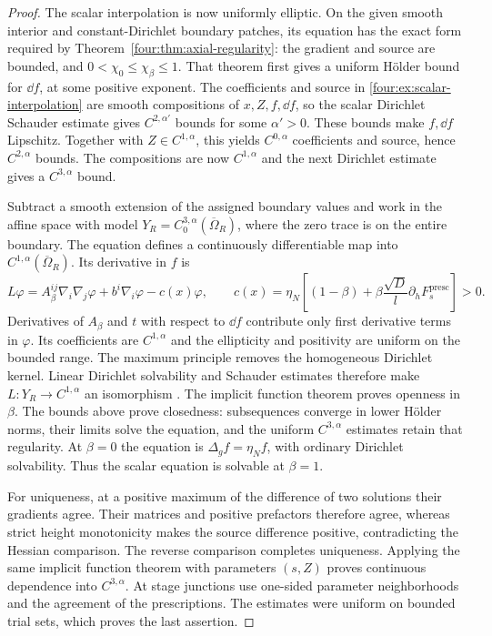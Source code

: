 \begin{proof}
The scalar interpolation is now uniformly elliptic.  On the given
smooth interior and constant-Dirichlet boundary patches, its equation
has the exact form required by Theorem~\ref{four:thm:axial-regularity}:
the gradient and source are bounded, and
$0<\chi_0\le\chi_\beta\le1$.  That theorem first gives a uniform
H\"older bound for $\dd f$, at some positive exponent.  The coefficients
and source in \eqref{four:ex:scalar-interpolation} are smooth compositions
of $x,Z,f,\dd f$, so the scalar Dirichlet Schauder estimate gives
$C^{2,\alpha'}$ bounds for some $\alpha'>0$.  These bounds make
$f,\dd f$ Lipschitz.  Together with $Z\in C^{1,\alpha}$, this yields
$C^{0,\alpha}$ coefficients and source, hence $C^{2,\alpha}$ bounds.
The compositions are now $C^{1,\alpha}$ and the next Dirichlet estimate
gives a $C^{3,\alpha}$ bound.

Subtract a smooth extension of the assigned boundary values and work
in the affine space with model
$Y_R=C^{3,\alpha}_0(\overline\Omega_R)$, where the zero trace is on the
entire boundary.  The equation defines a continuously differentiable
map into $C^{1,\alpha}(\overline\Omega_R)$.  Its derivative in $f$ is
\[
 L\varphi=A_\beta^{ij}\nabla_i\nabla_j\varphi
          +b^i\nabla_i\varphi-c(x)\varphi,
 \qquad
 c(x)=\eta_N\left[(1-\beta)+
 \beta\frac{\sqrt D}{l}\partial_hF_s^{\mathrm{presc}}\right]>0.
\]
Derivatives of $A_\beta$ and $t$ with respect to $\dd f$ contribute
only first derivative terms in $\varphi$.  Its coefficients are
$C^{1,\alpha}$ and the ellipticity and positivity are uniform on the
bounded range.  The maximum principle removes the homogeneous
Dirichlet kernel.  Linear Dirichlet solvability and Schauder estimates
therefore make $L:Y_R\to C^{1,\alpha}$ an isomorphism
\cite{GilbargTrudinger2001}.  The implicit function theorem proves openness in
$\beta$.  The bounds above prove closedness: subsequences converge in
lower H\"older norms, their limits solve the equation, and the uniform
$C^{3,\alpha}$ estimates retain that regularity.  At $\beta=0$ the
equation is $\Delta_gf=\eta_Nf$, with ordinary Dirichlet solvability.
Thus the scalar equation is solvable at $\beta=1$.

For uniqueness, at a positive maximum of the difference of two
solutions their gradients agree.  Their matrices and positive
prefactors therefore agree, whereas strict height monotonicity makes
the source difference positive, contradicting the Hessian comparison.
The reverse comparison completes uniqueness.  Applying the same
implicit function theorem with parameters $(s,Z)$ proves continuous
dependence into $C^{3,\alpha}$.  At stage junctions use one-sided
parameter neighborhoods and the agreement of the prescriptions.
The estimates were uniform on bounded trial sets, which proves the
last assertion.
\end{proof}

